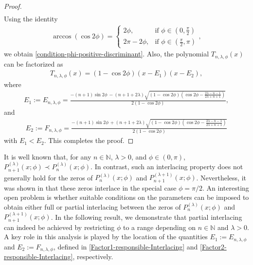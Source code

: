 \documentclass[final,3p,times,12pt]{elsarticle}
\numberwithin{equation}{section}  %
\begin{document}
\begin{proof}
\begin{align*}
		\end{align*}
		Using the identity
		\begin{align*}
			\arccos(\cos2\phi) =
			\begin{cases}
				2\phi, & \text{if } \phi \in (0,\frac{\pi}{2}) \\
				2\pi - 2\phi, & \text{if } \phi \in (\frac{\pi}{2}, \pi)
			\end{cases},
		\end{align*} we obtain  \eqref{condition-phi-positive-discriminant}. Also, the polynomial $T_{n,\lambda,\phi}(x)$ can be factorized as
		\begin{align}\label{factorised-Quadraticterm-involve-interlacing}
			T_{n,\lambda,\phi}(x)=(1-\cos2\phi)(x-E_1)(x-E_2),
		\end{align}where 
		\begin{align}\label{Factor1-responsible-Interlacing}
			E_1:=E_{n,\lambda,\phi}=\frac{-(n+1)\sin2\phi \,- (n+1+2\lambda)\sqrt{(1-\cos2\phi)\left(\cos2\phi-\frac{2\lambda-n-1}{2\lambda+n+1}\right)}}{2(1-\cos2\phi)},
		\end{align} and 
		\begin{align}\label{Factor2-responsible-Interlacing}
			E_2:=	F_{n,\lambda,\phi}=\frac{-(n+1)\sin2\phi \,+ (n+1+2\lambda)\sqrt{(1-\cos2\phi)\left(\cos2\phi-\frac{2\lambda-n-1}{2\lambda+n+1}\right)}}{2(1-\cos2\phi)}
		\end{align} with $E_1<E_2$.
		This completes the proof. 
	\end{proof}
	
	It is well known that, for any $n \in \mathbb{N}$, $\lambda > 0$, and
	$\phi \in (0,\pi)$, $P_{n+1}^{(\lambda)}(x;\phi)\prec P_{n}^{(\lambda)}(x;\phi)$. In contrast, such an
	interlacing property does not generally hold for the zeros of
	$P_{n}^{(\lambda)}(x;\phi)$ and $P_{n+1}^{(\lambda+1)}(x;\phi)$.
	Nevertheless, it was shown in \cite[Lemma~3.3]{Jooste-Jordaan-Numeralg-2025}
	that these zeros interlace in the special case $\phi = \pi/2$. An interesting open problem is whether suitable conditions on the
	parameters can be imposed to obtain either full or partial interlacing
	between the zeros of $P_{n}^{(\lambda)}(x;\phi)$ and
	$P_{n+1}^{(\lambda+1)}(x;\phi)$. In the following result, we demonstrate
	that partial interlacing can indeed be achieved by restricting $\phi$ to
	a range depending on $n \in \mathbb{N}$ and $\lambda > 0$. A key role in
	this analysis is played by the location of the quantities
	$E_1 := E_{n,\lambda,\phi}$ and $E_2 := F_{n,\lambda,\phi}$, defined in
	\eqref{Factor1-responsible-Interlacing} and
	\eqref{Factor2-responsible-Interlacing}, respectively.
	
\end{document}

